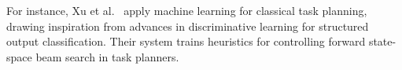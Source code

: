 
For instance, Xu et al.~\cite{Xu07discriminativelearning} apply machine learning for classical task
planning, drawing inspiration from advances in discriminative learning for
structured output classification. Their system trains heuristics for controlling forward
state-space beam search in task planners.
